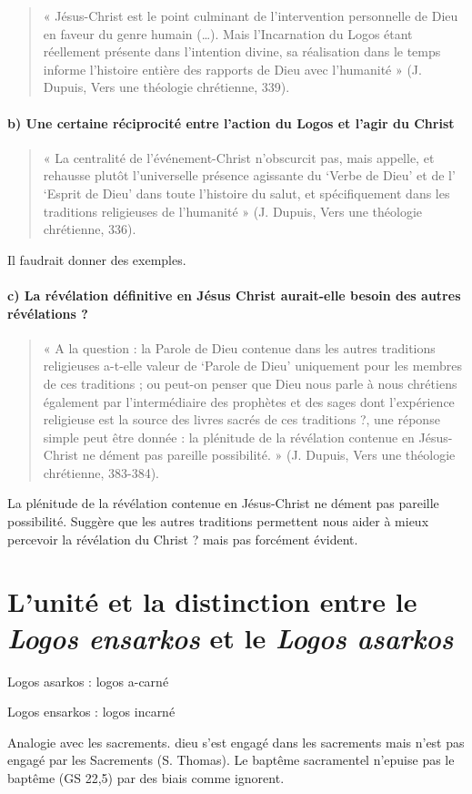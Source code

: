 \begin{quote}
    « Jésus-Christ est le point culminant de l’intervention personnelle de Dieu en faveur du genre humain
(…). Mais l’Incarnation du Logos étant réellement présente dans l’intention divine, sa réalisation dans
le temps informe l’histoire entière des rapports de Dieu avec l’humanité » (J. Dupuis, Vers une
théologie chrétienne, 339).
\end{quote}

\paragraph{b) Une certaine réciprocité entre l’action du Logos et l’agir du Christ}
 


\begin{quote}
    « La centralité de l’événement-Christ n’obscurcit pas, mais appelle, et rehausse plutôt l’universelle
présence agissante du ‘Verbe de Dieu’ et de l’ ‘Esprit de Dieu’ dans toute l’histoire du salut, et
spécifiquement dans les traditions religieuses de l’humanité » (J. Dupuis, Vers une théologie
chrétienne, 336).
\end{quote}

Il faudrait donner des exemples. 

\paragraph{c) La révélation définitive en Jésus Christ aurait-elle besoin des autres révélations ?}

 \begin{quote}
     « A la question : la Parole de Dieu contenue dans les autres traditions religieuses a-t-elle valeur de
‘Parole de Dieu’ uniquement pour les membres de ces traditions ; ou peut-on penser que Dieu nous
parle à nous chrétiens également par l’intermédiaire des prophètes et des sages dont l’expérience
religieuse est la source des livres sacrés de ces traditions ?, une réponse simple peut être donnée : la
plénitude de la révélation contenue en Jésus-Christ ne dément pas pareille possibilité. » (J. Dupuis,
Vers une théologie chrétienne, 383-384).
 \end{quote}
La
plénitude de la révélation contenue en Jésus-Christ ne dément pas pareille possibilité. Suggère que les autres traditions permettent nous aider à mieux percevoir la révélation du Christ ? mais pas forcément évident.

\section{L’unité et la distinction entre le \textit{Logos ensarkos} et le \textit{Logos asarkos}}
\begin{Def}
Logos asarkos : logos a-carné

Logos ensarkos : logos incarné
\end{Def}
Analogie avec les sacrements. dieu s'est engagé dans les sacrements mais n'est pas engagé par les Sacrements (S. Thomas). Le baptême sacramentel n'epuise pas le baptême (GS 22,5) par des biais comme ignorent. 


